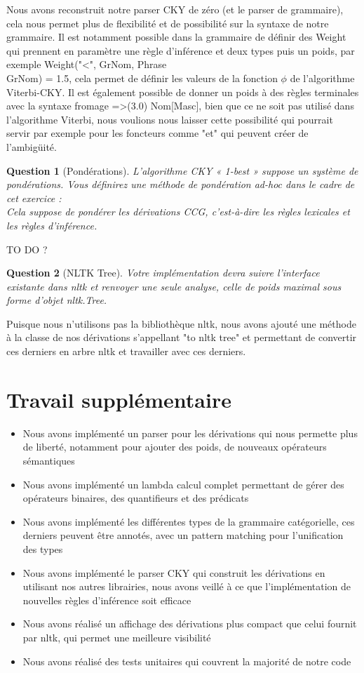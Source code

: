 \documentclass[12pt]{article}
\theoremstyle{exostyle}
\newtheorem{exo}{Question}[section]
\begin{document}
Nous avons reconstruit notre parser CKY de zéro (et le parser de grammaire), cela nous permet plus de flexibilité et de possibilité sur la syntaxe de notre grammaire. Il est notamment possible dans la grammaire de définir des Weight qui prennent en paramètre une règle d'inférence et deux types puis un poids, par exemple Weight("<", GrNom, Phrase\\GrNom) = 1.5, cela permet de définir les valeurs de la fonction $\phi$ de l'algorithme Viterbi-CKY. Il est également possible de donner un poids à des règles terminales avec la syntaxe fromage =>(3.0) Nom[Masc], bien que ce ne soit pas utilisé dans l'algorithme Viterbi, nous voulions nous laisser cette possibilité qui pourrait servir par exemple pour les foncteurs comme "et" qui peuvent créer de l'ambigüité.

\begin{exo}[Pondérations]
\textit{L’algorithme CKY « 1-best » suppose un système de pondérations. Vous
définirez une méthode de pondération ad-hoc dans le cadre de cet exercice :\\
Cela suppose de pondérer les dérivations CCG, c’est-à-dire les règles
lexicales et les règles d’inférence.}
\end{exo}

TO DO ?

\begin{exo}[NLTK Tree]
{Votre implémentation devra suivre l’interface existante dans nltk et renvoyer
une seule analyse, celle de poids maximal sous forme d’objet nltk.Tree.}
\end{exo}

Puisque nous n'utilisons pas la bibliothèque nltk, nous avons ajouté une méthode à la classe de nos dérivations s'appellant "to nltk tree" et permettant de convertir ces derniers en arbre nltk et travailler avec ces derniers.

\section{Travail supplémentaire}

\begin{itemize}
\item Nous avons implémenté un parser pour les dérivations qui nous permette plus de liberté, notamment pour ajouter des poids, de nouveaux opérateurs sémantiques
\item Nous avons implémenté un lambda calcul complet permettant de gérer des opérateurs binaires, des quantifieurs et des prédicats
\item Nous avons implémenté les différentes types de la grammaire catégorielle, ces derniers peuvent être annotés, avec un pattern matching pour l'unification des types
\item Nous avons implémenté le parser CKY qui construit les dérivations en utilisant nos autres librairies, nous avons veillé à ce que l'implémentation de nouvelles règles d'inférence soit efficace
\item Nous avons réalisé un affichage des dérivations plus compact que celui fournit par nltk, qui permet une meilleure visibilité
\item Nous avons réalisé des tests unitaires qui couvrent la majorité de notre code
\end{itemize}
\end{document}
